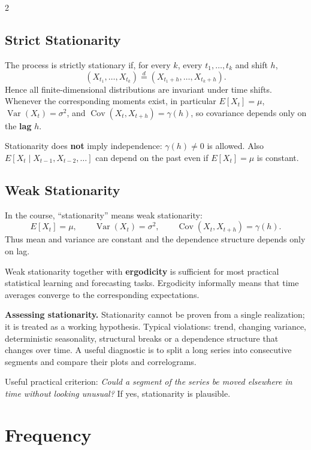 \documentclass[9pt,a4paper]{extarticle}
\newcommand{\key}[1]{\textbf{#1}}
\begin{document}
\begin{multicols}{2}
\subsection{Strict Stationarity}

The process is strictly stationary if, for every \(k\), every \(t_1,\ldots,t_k\) and shift \(h\),
\[
(X_{t_1},\ldots,X_{t_k})\overset d=(X_{t_1+h},\ldots,X_{t_k+h}).
\]
Hence all finite-dimensional distributions are invariant under time shifts. Whenever the corresponding moments exist, in particular \(E[X_t]=\mu\), \(\operatorname{Var}(X_t)=\sigma^2\), and \(\operatorname{Cov}(X_t,X_{t+h})=\gamma(h)\), so covariance depends only on the \key{lag} \(h\).

Stationarity does \key{not} imply independence: \(\gamma(h)\neq0\) is allowed. Also \(E[X_t\mid X_{t-1},X_{t-2},\ldots]\) can depend on the past even if \(E[X_t]=\mu\) is constant.

\subsection{Weak Stationarity}

In the course, ``stationarity'' means weak stationarity:
\[
\boxed{E[X_t]=\mu,\qquad \operatorname{Var}(X_t)=\sigma^2,\qquad
\operatorname{Cov}(X_t,X_{t+h})=\gamma(h).}
\]
Thus mean and variance are constant and the dependence structure depends only on lag.

Weak stationarity together with \key{ergodicity} is sufficient for most practical statistical learning and forecasting tasks. Ergodicity informally means that time averages converge to the corresponding expectations.

\key{Assessing stationarity.} Stationarity cannot be proven from a single realization; it is treated as a working hypothesis. Typical violations: trend, changing variance, deterministic seasonality, structural breaks or a dependence structure that changes over time. A useful diagnostic is to split a long series into consecutive segments and compare their plots and correlograms.

Useful practical criterion: \textit{Could a segment of the series be moved elsewhere in time without looking unusual?} If yes, stationarity is plausible.

\section{Frequency}


\end{multicols}
\end{document}
